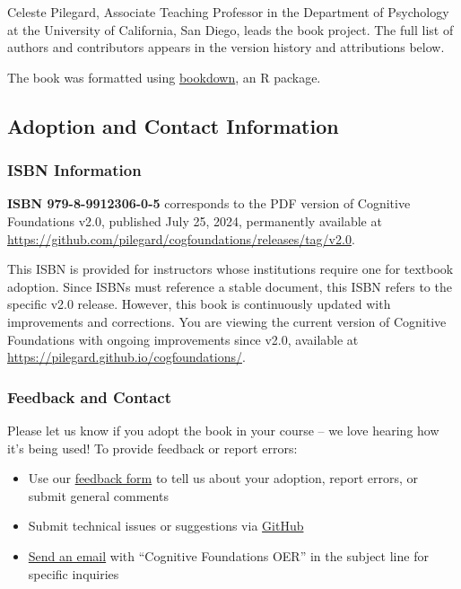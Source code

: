 \documentclass[
]{krantz}
\providecommand{\tightlist}{%
  \setlength{\itemsep}{0pt}\setlength{\parskip}{0pt}}
\begin{document}
Celeste Pilegard, Associate Teaching Professor in the Department of Psychology at the University of California, San Diego, leads the book project. The full list of authors and contributors appears in the version history and attributions below.

The book was formatted using \href{https://bookdown.org/}{bookdown}, an R package.

\subsection*{Adoption and Contact Information}\label{adoption-and-contact-information}


\subsubsection*{ISBN Information}\label{isbn-information}


\textbf{ISBN 979-8-9912306-0-5} corresponds to the PDF version of Cognitive Foundations v2.0, published July 25, 2024, permanently available at \url{https://github.com/pilegard/cogfoundations/releases/tag/v2.0}.

This ISBN is provided for instructors whose institutions require one for textbook adoption. Since ISBNs must reference a stable document, this ISBN refers to the specific v2.0 release. However, this book is continuously updated with improvements and corrections. You are viewing the current version of Cognitive Foundations with ongoing improvements since v2.0, available at \url{https://pilegard.github.io/cogfoundations/}.

\subsubsection*{Feedback and Contact}\label{feedback-and-contact}


Please let us know if you adopt the book in your course -- we love hearing how it's being used! To provide feedback or report errors:

\begin{itemize}
\tightlist
\item
  Use our \href{https://forms.gle/83CBvAgLuJshRfz37}{feedback form} to tell us about your adoption, report errors, or submit general comments
\item
  Submit technical issues or suggestions via \href{https://github.com/pilegard/cogfoundations}{GitHub}
\item
  \href{mailto:pilegard@ucsd.edu}{Send an email} with ``Cognitive Foundations OER'' in the subject line for specific inquiries
\end{itemize}
\end{document}
